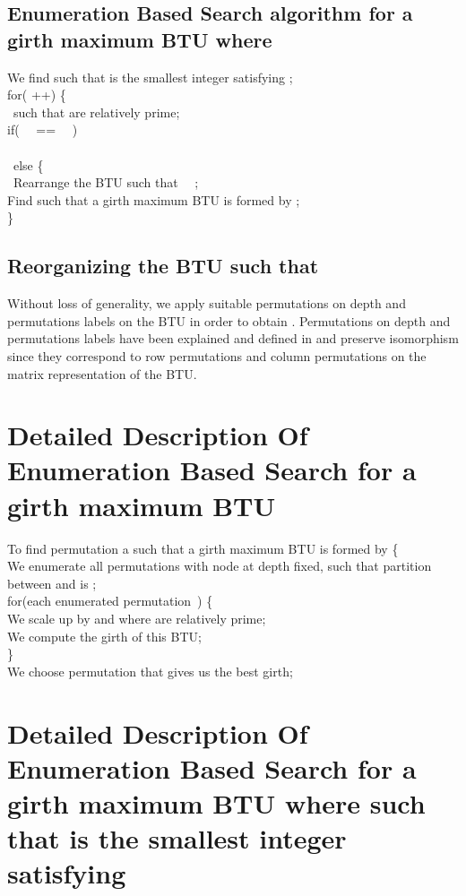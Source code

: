 \documentclass{llncs}
\begin{document}
\subsection{Enumeration Based Search algorithm for a girth maximum  BTU  where }
We find  such that  is the smallest integer satisfying ; \\
for(  ++) \{ \\
\   such that  are relatively prime; \\
if(  \ \ == \   \ ) \\
  \\
\ else \{ \\
\ Rearrange the  BTU such that \ \  ; \\
Find  such that a girth maximum   BTU is formed by  ; \\
\}

\subsection {Reorganizing the  BTU such that  }
Without loss of generality,  we apply suitable permutations on depth and permutations labels on the  BTU in order to obtain .  Permutations on depth and permutations labels have been explained and defined in  and preserve isomorphism since they correspond to row permutations and column permutations on the matrix representation of the  BTU.

\section {Detailed Description Of Enumeration Based Search for a girth maximum   BTU}

To find permutation a  such that a girth maximum   BTU is formed by   \{  \\
We enumerate all permutations   with node at depth  fixed,
such that partition between    and   is  ; \\
for(each enumerated permutation\   ) \{ \\
We scale up  by   and   where   are relatively prime; \\
We compute the girth of this  BTU; \\
\} \\
We choose permutation  that gives us the best girth;

\section {Detailed Description Of Enumeration Based Search for a girth maximum   BTU where  such that  is the smallest integer satisfying  }
\end{document}
